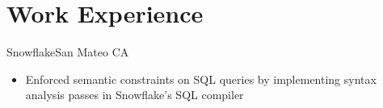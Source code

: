 \documentclass{moderncv}
\begin{document}
\makecvtitle
\begin{comment}
\section{Skills}
\begin{minipage}{0.25\textwidth}
    \begin{itemize}
        \item Reinforcement Learning
    \end{itemize}
\end{minipage}
    \begin{minipage}{0.25\textwidth}
    \begin{itemize}
        \item Reinforcement Learning
    \end{itemize}
\end{minipage}
\begin{minipage}{0.25\textwidth}
    \begin{itemize}
        \item Reinforcement Learning
    \end{itemize}
\end{minipage}
\begin{minipage}{0.25\textwidth}
    \begin{itemize}
        \item Reinforcement Learning
    \end{itemize}
\end{minipage}
\end{comment}
\section{Work Experience}

{Snowflake}{San Mateo CA}{}
{\begin{itemize}
    \item Enforced semantic constraints on SQL queries by implementing syntax analysis passes in Snowflake's SQL compiler
\end{itemize}}
\end{document}
